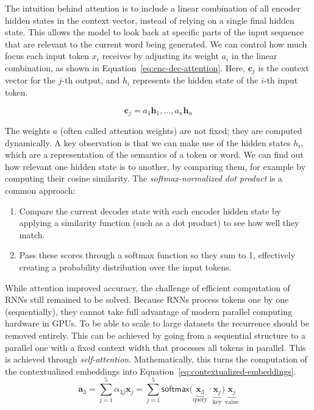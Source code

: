 The intuition behind attention is to include a linear combination of all encoder hidden states in the context vector, instead of relying on a single final hidden state. This allows the model to look back at specific parts of the input sequence that are relevant to the current word being generated. We can control how much focus each input token $x_i$ receives by adjusting its weight $a_i$ in the linear combination, as shown in Equation~\ref{eq:enc-dec-attention}. Here, $\mathbf{c}_j$ is the context vector for the $j$-th output, and $h_i$ represents the hidden state of the $i$-th input token.

\begin{equation}
\label{eq:enc-dec-attention}
    \mathbf{c}_{j} = a_1\mathbf{h}_1, \dots, a_n\mathbf{h}_n
\end{equation}

The weights $a$ (often called attention weights) are not fixed; they are computed dynamically. A key observation is that we can make use of the hidden states $h_i$, which are a representation of the semantics of a token or word. We can find out how relevant one hidden state is to another, by comparing them,  for example by computing their cosine similarity. The {\em softmax-normalized dot product} is a common approach:
\begin{enumerate}
    \item Compare the current decoder state with each encoder hidden state by applying a similarity function (such as a dot product) to see how well they match.
    \item Pass these scores through a softmax function so they sum to 1, effectively creating a probability distribution over the input tokens.
\end{enumerate}
While attention improved accuracy, the challenge of efficient computation of RNNs still remained to be solved. Because RNNs process tokens one by one (sequentially), they cannot take full advantage of modern parallel computing hardware in GPUs. To be able to scale to  large datasets the  recurrence should be removed entirely. This can be achieved by going from a sequential structure to a parallel one  with a fixed context width that processes all tokens in parallel. This is achieved through \textit{self-attention}.  Mathematically, this turns the computation of the contextualized embeddings into Equation~\ref{eq:contextualized-embeddings}.
\begin{equation}
\label{eq:contextualized-embeddings}
    \mathbf{a}_3 = \sum_{j=1}^{5} \alpha_{3j} \mathbf{x}_j = \sum_{j=1}^{5} \textsf{softmax}{(\underbrace{\mathbf{x}_3}_{\text{query}} \cdot \underbrace{\mathbf{x}_j}_{\text{key}}}) \underbrace{\mathbf{x}_j}_{\text{value}} 
\end{equation}

